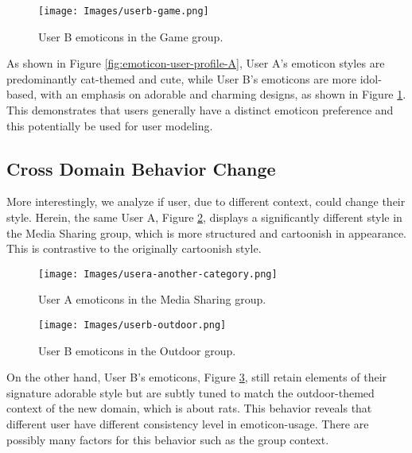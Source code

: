 \begin{figure}[htbp] 
    \centering \texttt{[image: Images/userb-game.png]} 
    \caption{User B emoticons in the Game group.} 
\label{fig:emoticon-user-profile-B} 
\end{figure}

As shown in Figure \ref{fig:emoticon-user-profile-A}, User A's emoticon styles are predominantly cat-themed and cute, while User B’s emoticons are more idol-based, with an emphasis on adorable and charming designs, as shown in Figure \ref{fig:emoticon-user-profile-B}. This demonstrates that users generally have a distinct emoticon preference and this potentially be used for user modeling.

\subsection{Cross Domain Behavior Change}

More interestingly, we analyze if user, due to different context, could change their style. Herein, the same User A, Figure \ref{fig:emoticon-user-profile-A-2}, displays a significantly different style in the Media Sharing group, which is more structured and cartoonish in appearance. This is contrastive to the originally cartoonish style.

\begin{figure}[htbp] 
    \centering \texttt{[image: Images/usera-another-category.png]} 
    \caption{User A emoticons in the Media Sharing group.} 
\label{fig:emoticon-user-profile-A-2} 
\end{figure}

\begin{figure}[htbp] 
    \centering \texttt{[image: Images/userb-outdoor.png]} 
    \caption{User B emoticons in the Outdoor group.} 
\label{fig:emoticon-user-profile-B-2} 
\end{figure}

On the other hand, User B’s emoticons, Figure \ref{fig:emoticon-user-profile-B-2}, still retain elements of their signature adorable style but are subtly tuned to match the outdoor-themed context of the new domain, which is about rats. This behavior reveals that different user have different consistency level in emoticon-usage. There are possibly many factors for this behavior such as the group context. 

